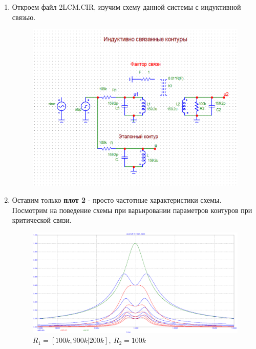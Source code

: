 \documentclass[a4paper, 12pt]{article}%
\begin{document}
\begin{enumerate}

\item Откроем файл 2LCM.CIR, изучим схему данной системы с индуктивной связью.

\begin{figure}[h!]
\centering
\includegraphics[scale = 0.7]{images/2LCM.png}
\label{fig:Image1}
\end{figure}

\newpage

\item Оставим только \textbf{плот 2} - просто частотные характеристики схемы. Посмотрим на поведение схемы при варьировании параметров контуров при критической связи.

\begin{figure}[h!]
\centering
\includegraphics[scale = 0.4]{images/plot2_1.png}
\caption{$R_1 = [100k, 900k|200k], \: R_2 = 100k$}
\label{fig:Image1}
\end{figure}


\end{enumerate}
\end{document}
